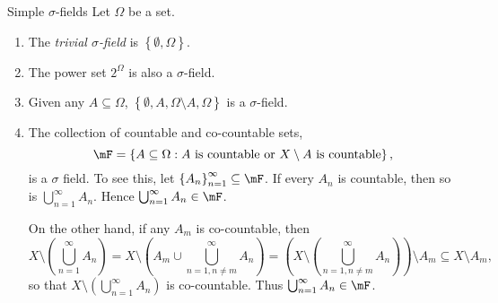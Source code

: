 \documentclass[stat901]{subfiles}
\begin{document}
    \begin{example}{Simple $\sigma$-fields}
        Let $\Omega$ be a set.
        \begin{enumerate}
            \item The \emph{trivial $\sigma$-field} is $\left\lbrace \emptyset,\Omega \right\rbrace$.
            \item The power set $2^{\Omega}$ is also a $\sigma$-field.
            \item Given any $A\subseteq\Omega$, $\left\lbrace \emptyset, A, \Omega\setminus A, \Omega \right\rbrace$ is a $\sigma$-field.
            \item The collection of countable and co-countable sets,
                \begin{equation*}
                    \mF = \left\lbrace A\subseteq\Omega: \text{$A$ is countable or $X\setminus A$ is countable} \right\rbrace,
                \end{equation*}
                is a $\sigma$ field. To see this, let $\left\lbrace A_n \right\rbrace^{\infty}_{n=1}\subseteq\mF$. If every $A_n$ is countable, then so is $\bigcup^{\infty}_{n=1} A_n$. Hence $\bigcup^{\infty}_{n=1} A_n\in\mF$.

                On the other hand, if any $A_m$ is co-countable, then
                \begin{equation*}
                    X\setminus \left( \bigcup^{\infty}_{n=1} A_n \right) = X\setminus \left( A_m \cup \bigcup^{\infty}_{n=1, n\neq m} A_n \right) = \left( X\setminus \left( \bigcup^{\infty}_{n=1,n\neq m} A_n \right) \right) \setminus A_m \subseteq X\setminus A_m,
                \end{equation*}
                so that $X\setminus \left( \bigcup^{\infty}_{n=1}A_n \right)$ is co-countable. Thus $\bigcup^{\infty}_{n=1}A_n\in\mF$.
        \end{enumerate}
    \end{example}

    \rruleline
\end{document}
